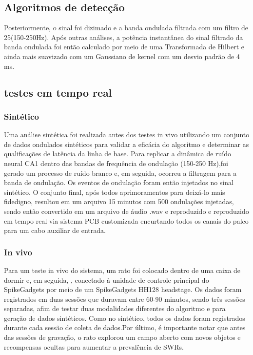 \documentclass{IEEEtran}
\begin{document}
\subsection{Algoritmos de detecção}
Posteriormente, o sinal foi dizimado e a banda ondulada filtrada com um filtro de 25(150-250Hz). Após outras análises, a potência instantânea do sinal filtrado da banda ondulada foi então calculado por meio de uma Transformada de Hilbert e ainda mais suavizado com um Gaussiano de kernel com um desvio padrão de 4 ms.

\subsection{testes em tempo real}
\subsubsection{Sintético}
Uma análise sintética foi realizada antes dos testes in vivo utilizando um conjunto de dados ondulados sintéticos para validar a eficácia do algoritmo e determinar as qualificações de latência da linha de base. Para replicar a dinâmica de ruído neural CA1 dentro das bandas de frequência de ondulação (150-250 Hz),foi gerado um processo de ruído branco e, em seguida, ocorreu a filtragem para a banda de ondulação. Os eventos de ondulação foram então injetados no sinal sintético. O conjunto final, após todos aprimoramentos para deixá-lo mais fidedigno, resultou em um arquivo 15 minutos com 500 ondulações injetadas, sendo então convertido em um arquivo de áudio .wav e reproduzido e reproduzido em tempo real via sistema PCB customizada encurtando todos os canais do palco para um cabo auxiliar de entrada.

\subsubsection{In vivo}
Para um teste in vivo do sistema, um rato foi colocado dentro de uma caixa de dormir e, em seguida, , conectado à unidade de controle principal do SpikeGadgets por meio de um SpikeGadgets HH128 headstage. Os dados foram registrados em duas sessões que duravam entre 60-90 minutos, sendo três sessões separadas, afim de testar duas modalidades diferentes do algoritmo  e para geração de dados sintéticos. Como no sintético, todos os dados foram registrados durante cada sessão de coleta de dados.Por último, é importante notar que antes das sessões de gravação, o rato explorou um campo aberto com novos objetos e recompensas ocultas para aumentar a prevalência de SWRs.
\end{document}
